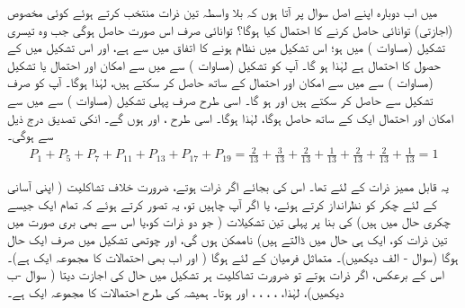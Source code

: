 میں اب دوبارہ اپنے اصل سوال پر آتا ہوں کہ بلا واسطہ تین ذرات منتخب کرتے ہوئے کوئی مخصوص (اجازتی) توانائی  حاصل کرنے کا احتمال  کیا ہوگا؟ توانائی  صرف اس صورت حاصل ہوگی جب وہ تیسری تشکیل (مساوات ) میں ہو؛ اس تشکیل میں نظام ہونے کا اتفاق  میں سے  ہے، اور اس تشکیل میں  کے حصول کا احتمال  ہے لہٰذا ہو گا۔ آپ  کو تشکیل  (مساوات  ) سے  میں سے  امکان اور احتمال  یا تشکیل  (مساوات ) سے  میں سے  امکان اور احتمال  کے ساتھ حاصل کر سکتے ہیں، 
 لہٰذا ہوگا۔ آپ  کو صرف تشکیل  سے حاصل کر سکتے ہیں اور  ہو گا۔ اسی طرح  صرف پہلی تشکیل (مساوات ) سے  میں سے  امکان اور احتمال ایک  کے ساتھ حاصل ہوگا، 
 لہٰذا ہوگا۔ اسی طرح ،
  اور
  ہوں گے۔ انکی تصدیق درج ذیل سے ہوگی۔
\begin{align*}
	P_1 + P_5 + P_7 + P_{11} + P_{13} + P_{17} + P_{19} = \frac{2}{13} + \frac{3}{13} + \frac{2}{13} + \frac{1}{13} + \frac{2}{13} + \frac{2}{13} + \frac{1}{13} = 1
\end{align*} 

یہ قابل ممیز ذرات کے لئے تھا۔ اس کی بجائے اگر ذرات  ہوتے، ضرورت خلاف تشاکلیت ( اپنی آسانی کے لئے چکر کو نظرانداز کرتے ہوئے، یا اگر آپ چاہیں تو، یہ تصور کرتے ہوئے کہ تمام ایک جیسے چکری حال میں ہیں) کی بنا پر پہلی تین تشکیلات ( جو دو ذرات کو،یا اس سے بھی بری صورت میں تین ذرات کو، ایک ہی حال میں ڈالتے ہیں) ناممکن ہوں گی، اور چوتھی تشکیل میں صرف ایک حال ہوگا (سوال - الف دیکھیں)۔ متماثل فرمیان کے لئے  ہوگا ( اور اب بھی احتمالات کا مجموعہ ایک  ہے)۔ اس کے برعکس، اگر ذرات  ہوتے تو ضرورت تشاکلیت ہر تشکیل میں  حال کی اجازت دیتا ( سوال -ب دیکھیں)، لہٰذا،
 ،
 ، 
 ،
 ،
  اور
  ہوتا۔ ہمیشہ کی طرح احتمالات کا مجموعہ ایک  ہے۔

